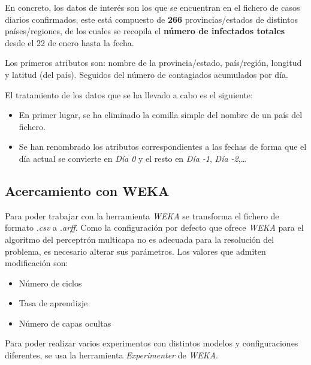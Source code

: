 \documentclass[12pt,a4paper, xcolor=table]{article}
\begin{document}
    \vspace{3mm}

    En concreto, los datos de interés son los que se encuentran en el fichero de casos diarios confirmados, este está compuesto de \textbf{266} provincias/estados de distintos países/regiones, de los cuales se recopila el \textbf{número de infectados totales} desde el 22 de enero hasta la fecha.

    \vspace{1mm}

    Los primeros atributos son: nombre de la provincia/estado, país/región, longitud y latitud (del país). Seguidos del número de contagiados acumulados por día.

    \vspace{3mm}

    El tratamiento de los datos que se ha llevado a cabo es el siguiente:

    \begin{itemize}
        \item En primer lugar, se ha eliminado la comilla simple del nombre de un país del fichero.
        \item Se han renombrado los atributos correspondientes a las fechas de forma que el día actual se convierte en \textit{Día 0} y el resto en \textit{Día -1}, \textit{Día -2},\dots
    \end{itemize}




    \subsection{Acercamiento con WEKA}

      Para poder trabajar con la herramienta \textit{WEKA} se transforma el fichero de formato \textit{.csv} a \textit{.arff}. Como la configuración por defecto que ofrece \textit{WEKA} para el algoritmo del perceptrón multicapa no es adecuada para la resolución del problema, es necesario alterar sus parámetros. Los valores que admiten modificación son:

      \begin{itemize}
        \item Número de ciclos
        \item Tasa de aprendizje
        \item Número de capas ocultas
      \end{itemize}

      Para poder realizar varios experimentos con distintos modelos y configuraciones diferentes, se usa la herramienta \textit{Experimenter} de \textit{WEKA}.
\end{document}

